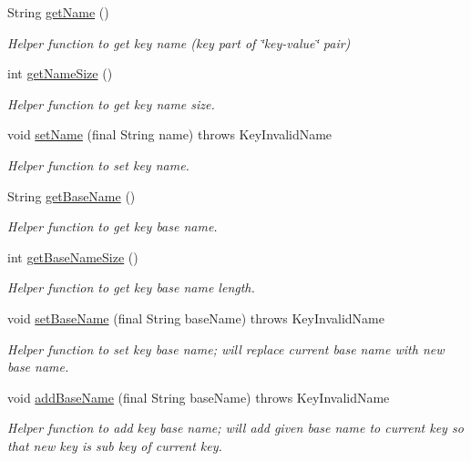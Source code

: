 \begin{DoxyCompactItemize}
String \hyperlink{classorg_1_1libelektra_1_1Key_a668626c8403940015ff5031cfa5e973c}{get\+Name} ()
\begin{DoxyCompactList}\small\item\em Helper function to get key name (key part of \char`\"{}key-\/value\char`\"{} pair) \end{DoxyCompactList}\item 
int \hyperlink{classorg_1_1libelektra_1_1Key_aa6477bb5eb12f739858f285650816cc6}{get\+Name\+Size} ()
\begin{DoxyCompactList}\small\item\em Helper function to get key name size. \end{DoxyCompactList}\item 
void \hyperlink{classorg_1_1libelektra_1_1Key_abd5602765701a10b6a10887c09810cf5}{set\+Name} (final String name)  throws Key\+Invalid\+Name 	
\begin{DoxyCompactList}\small\item\em Helper function to set key name. \end{DoxyCompactList}\item 
String \hyperlink{classorg_1_1libelektra_1_1Key_a32c556682f808bbc0a4b676879f6b86f}{get\+Base\+Name} ()
\begin{DoxyCompactList}\small\item\em Helper function to get key base name. \end{DoxyCompactList}\item 
int \hyperlink{classorg_1_1libelektra_1_1Key_a24bd83bcae08b956150d8ae3dafe738e}{get\+Base\+Name\+Size} ()
\begin{DoxyCompactList}\small\item\em Helper function to get key base name length. \end{DoxyCompactList}\item 
void \hyperlink{classorg_1_1libelektra_1_1Key_a5226472bedc6a02dee826ee3facdb25f}{set\+Base\+Name} (final String base\+Name)  throws Key\+Invalid\+Name 	
\begin{DoxyCompactList}\small\item\em Helper function to set key base name; will replace current base name with new base name. \end{DoxyCompactList}\item 
void \hyperlink{classorg_1_1libelektra_1_1Key_a07a939d44265c7b017104f3f37e9ca16}{add\+Base\+Name} (final String base\+Name)  throws Key\+Invalid\+Name 	
\begin{DoxyCompactList}\small\item\em Helper function to add key base name; will add given base name to current key so that new key is sub key of current key. \end{DoxyCompactList}\item 

\end{DoxyCompactItemize}
